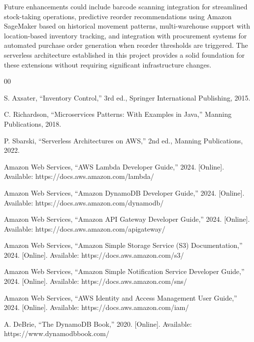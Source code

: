 \documentclass[conference]{IEEEtran}
\begin{document}
Future enhancements could include barcode scanning integration for streamlined stock-taking operations, predictive reorder recommendations using Amazon SageMaker based on historical movement patterns, multi-warehouse support with location-based inventory tracking, and integration with procurement systems for automated purchase order generation when reorder thresholds are triggered. The serverless architecture established in this project provides a solid foundation for these extensions without requiring significant infrastructure changes.

\begin{thebibliography}{00}

 S. Axsater, ``Inventory Control,'' 3rd ed., Springer International Publishing, 2015.

 C. Richardson, ``Microservices Patterns: With Examples in Java,'' Manning Publications, 2018.

 P. Sbarski, ``Serverless Architectures on AWS,'' 2nd ed., Manning Publications, 2022.

 Amazon Web Services, ``AWS Lambda Developer Guide,'' 2024. [Online]. Available: https://docs.aws.amazon.com/lambda/

 Amazon Web Services, ``Amazon DynamoDB Developer Guide,'' 2024. [Online]. Available: https://docs.aws.amazon.com/dynamodb/

 Amazon Web Services, ``Amazon API Gateway Developer Guide,'' 2024. [Online]. Available: https://docs.aws.amazon.com/apigateway/

 Amazon Web Services, ``Amazon Simple Storage Service (S3) Documentation,'' 2024. [Online]. Available: https://docs.aws.amazon.com/s3/

 Amazon Web Services, ``Amazon Simple Notification Service Developer Guide,'' 2024. [Online]. Available: https://docs.aws.amazon.com/sns/

 Amazon Web Services, ``AWS Identity and Access Management User Guide,'' 2024. [Online]. Available: https://docs.aws.amazon.com/iam/

 A. DeBrie, ``The DynamoDB Book,'' 2020. [Online]. Available: https://www.dynamodbbook.com/

\end{thebibliography}
\end{document}

